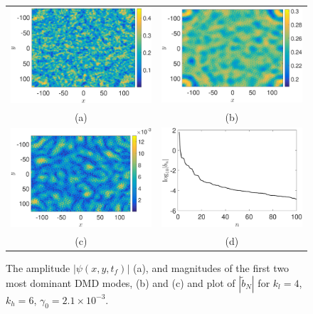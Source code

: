 \documentclass[a4paper,11pt]{article}
\begin{document}
\begin{figure}
\centering
\begin{tabular}{cc}
\includegraphics[width=.52\textwidth]{amplitude_wwt_K_128_Lx_128_tf_1pt5e4} &\hspace{-24pt} \includegraphics[width=.52\textwidth]{dmd1_amplitude_wwt_K_128_Lx_128_tf_1pt5e4} \\
(a) & (b)\\
\includegraphics[width=.52\textwidth]{dmd2_amplitude_wwt_K_128_Lx_128_tf_1pt5e4} &\hspace{-24pt} \includegraphics[width=.52\textwidth]{dmd_mags_wwt_K_128_Lx_128_tf_1pt5e4}\\
(c) & (d) 
\end{tabular}
\caption{The amplitude $\left|\psi(x,y,t_{f})\right|$ (a), and magnitudes of the first two most dominant DMD modes, (b) and (c) and plot of $\left|\tilde{b}_{N}\right|$ for $k_{l}=4$, $k_{h}=6$, $\gamma_{0}=2.1\times 10^{-3}$.  }
\label{fig:ampcomplfwwt}
\end{figure}
\end{document}
